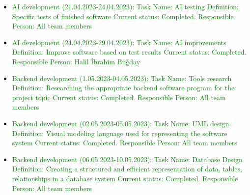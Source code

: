 \documentclass[conference]{IEEEtran}
\begin{document}
\begin{itemize}
  \item \textcolor{green} { AI development (21.04.2023-24.04.2023):\newline\newline
  Task Name: AI testing\newline
  Definition: Specific tests of finished software\newline
  Current status: Completed.\newline 
  Responsible Person: All team members\newline\newline
  }
  \item \textcolor{green} { AI development (24.04.2023-29.04.2023):\newline\newline
  Task Name: AI improvements\newline
  Definition: Improve software based on test results\newline
  Current status: Completed.\newline 
  Responsible Person: Halil İbrahim Buğday\newline
}

  \item \textcolor{green} {Backend development (1.05.2023-04.05.2023):\newline\newline
  Task Name: Tools research\newline
  Definition: Researching the appropriate backend software program for the project topic\newline
  Current status: Completed.\newline 
  Responsible Person: All team members\newline
}
 \item \textcolor{green} {Backend development (02.05.2023-05.05.2023):\newline\newline
  Task Name: UML design\newline
  Definition:  Visual modeling language used for representing the software system \newline
  Current status: Completed.\newline 
  Responsible Person: All team members\newline
}
  

   \item \textcolor{green} {Backend development (06.05.2023-10.05.2023):\newline\newline
  Task Name: Database Design\newline
  Definition:  Creating a structured and efficient representation of data, tables, relationships in a database system\newline
  Current status: Completed.\newline 
  Responsible Person: All team members\newline
}


\end{itemize}
\end{document}
